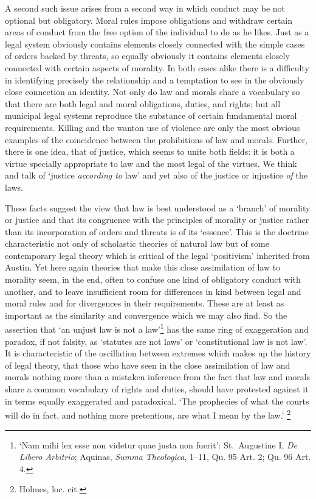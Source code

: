 A second such issue arises from a second way in which conduct may be not
optional but obligatory. Moral rules impose obligations and withdraw
certain areas of conduct from the free option of the individual to do as
he likes. Just as a legal system obviously contains elements closely
connected with the simple cases of orders backed by threats, so equally
obviously it contains elements closely connected with certain aspects of
morality. In both cases alike there is a difficulty in identifying
precisely the relationship and a temptation to see in the obviously
close connection an identity. Not only do law and morals share a
vocabulary so that there are both legal and moral obligations, duties,
and rights; but all municipal legal systems reproduce the substance of
certain fundamental moral requirements. Killing and the wanton use of
violence are only the most obvious examples of the coincidence between
the prohibitions of law and morals. Further, there is one idea, that of
justice, which seems to unite both fields: it is both a virtue specially
appropriate to law and the most legal of the virtues. We think and talk
of `justice \emph{according to} law' and yet also of the justice or
injustice \emph{of} the laws.

These facts suggest the view that law is best understood as a `branch'
of morality or justice and that its congruence with the principles of
morality or justice rather than its incorporation of orders and threats
is of its `essence'. This is the doctrine characteristic not only of
scholastic theories of natural law but of some contemporary legal theory
which is critical of the legal `positivism' inherited from Austin. Yet
here again theories that make this close assimilation of law to morality
seem, in the end, often to confuse one kind of obligatory conduct with
another, and to leave insufficient room for differences in kind between
legal and moral rules and for divergences in their requirements. These
are at least as important as the similarity and convergence which we may
also find. So the assertion that `an unjust law is not a law'\footnote{`Nam
  mihi lex esse non videtur quae justa non fuerit': St.~Augustine I,
  \emph{De Libero Arbitrio}; Aquinas, \emph{Summa Theologica}, 1--11,
  Qu. 95 Art. 2; Qu. 96 Art. 4.} has the same ring of exaggeration and
paradox, if not falsity, as `statutes are not laws' or `constitutional
law is not law'. It is characteristic of the oscillation between
extremes which makes up the history of legal theory, that those who have
seen in the close assimilation of law and morals nothing more than a
mistaken inference from the fact that law and morals share a common
vocabulary of rights and duties, should have protested against it in
terms equally exaggerated and paradoxical. `The prophecies of what the
courts will do in fact, and nothing more pretentious, are what I mean by
the law.' \footnote{Holmes, loc. cit.}

